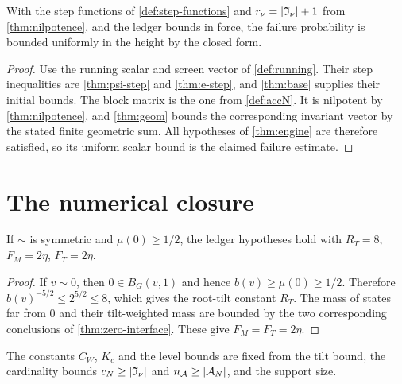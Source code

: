 \begin{theorem}
\label{thm:closure-form}
\leanok
With the step functions of \cref{def:step-functions} and $r_\nu=\lvert \mathfrak I_\nu \rvert+1$ from
\cref{thm:nilpotence}, and the ledger bounds in force, the failure probability is bounded
uniformly in the height by the closed form.
\end{theorem}

\begin{proof}
\leanok
{}
Use the running scalar and screen vector of \cref{def:running}. Their step inequalities are
\cref{thm:psi-step} and \cref{thm:e-step}, and \cref{thm:base} supplies their initial bounds. The
block matrix is the one from \cref{def:accN}. It is nilpotent by \cref{thm:nilpotence}, and
\cref{thm:geom} bounds the corresponding invariant vector by the stated finite geometric sum.
All hypotheses of \cref{thm:engine} are therefore satisfied, so its uniform scalar bound is the
claimed failure estimate.
\end{proof}

\section{The numerical closure}

\begin{lemma}
\label{thm:ledger-constants}
\leanok
If $\sim$ is symmetric and $\mu(0)\geq1/2$, the ledger hypotheses hold with $R_T=8$,
$F_M=2\eta$, $F_T=2\eta$.
\end{lemma}

\begin{proof}
\leanok
{}
If $v\sim0$, then $0\in B_G(v,1)$ and hence
$b(v)\geq\mu(0)\geq1/2$. Therefore
$b(v)^{-5/2}\leq2^{5/2}\leq8$, which gives the root-tilt constant $R_T$. The mass of states
far from $0$ and their tilt-weighted mass are bounded by the two corresponding conclusions of
\cref{thm:zero-interface}. These give $F_M=F_T=2\eta$.
\end{proof}

\begin{definition}
\label{def:constants}
\leanok
{}
The constants $C_W$, $K_c$ and the level bounds are fixed from the tilt bound, the cardinality
bounds $c_N\geq\lvert \mathfrak I_\nu \rvert$ and $n_{\mathcal{A}}\geq\lvert \mathcal{A}_N \rvert$, and the support size.
\end{definition}

